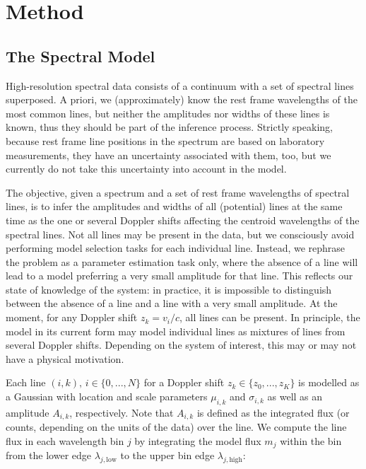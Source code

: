\documentclass[12pt]{emulateapj}
\newcommand{\mean}{m}
\begin{document}
\section{Method}
\label{sec:method}

\subsection{The Spectral Model}
\label{sec:spectralmodel}

High-resolution spectral data consists of a continuum with a set of spectral lines superposed. A priori, we (approximately) know the rest frame wavelengths of the most common lines, but neither the amplitudes nor widths of these lines is known, thus they should be part of the inference process. Strictly speaking, because rest frame line positions in the spectrum are based on laboratory measurements, they have an uncertainty associated with them, too, but we currently do not take this uncertainty into account in the model.

The objective, given a spectrum and a set of rest frame wavelengths of spectral lines, is to infer the amplitudes and widths of all (potential) lines at the same time as the one or several Doppler shifts affecting the centroid wavelengths of the spectral lines. Not all lines may be present in the data, but we consciously avoid performing model selection tasks for each individual line. Instead, we rephrase the problem as a parameter estimation task only, where the absence of a line will lead to a model preferring a very small amplitude for that line. This reflects our state of knowledge of the system: in practice, it is impossible to distinguish between the absence of a line and a line with a very small amplitude.
At the moment, for any Doppler shift $z_k = v_i/c$, all lines can be present. In principle, the model in its current form may model individual lines as mixtures of lines from several Doppler shifts. Depending on the system of interest, this may or may not have a physical motivation. 

Each line $(i,k), \, i \in \{0, ..., N\}$ for a Doppler shift $z_k \in \{z_0, ..., z_K\}$ is modelled as a Gaussian with location and scale parameters $\mu_{i,k}$ and $\sigma_{i,k}$ as well as an amplitude $A_{i,k}$, respectively. Note that $A_{i,k}$ is defined as the integrated flux (or counts, depending on the units of the data) over the line. We compute the line flux in each wavelength bin $j$ by integrating the model flux $\mean_j$ within the bin from the lower edge $\lambda_{j, \mathrm{low}}$ to the upper bin edge $\lambda_{j, \mathrm{high}}$:
\end{document}

